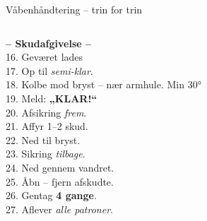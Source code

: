 \begin{frame}{Våbenhåndtering – trin for trin}
\begin{columns}[T]
    \setlength{\parskip}{0.28em} %
    \footnotesize
    \RaggedRight

    \textbf{-- Skudafgivelse --} \\
    16. Geværet lades \\
    17. Op til \textit{semi-klar}. \\
    18. Kolbe mod bryst – nær armhule. Min 30° \\
    19. Meld: \textbf{„KLAR!“} \\
    20. Afsikring \textit{frem}. \\
    21. Affyr 1–2 skud. \\
    22. Ned til bryst. \\
    23. Sikring \textit{tilbage}. \\
    24. Ned gennem vandret. \\
    25. Åbn – fjern afskudte. \\
    26. Gentag \textbf{4 gange}. \\
    27. Aflever \textit{alle patroner}. \par

  \end{columns}
\end{frame}